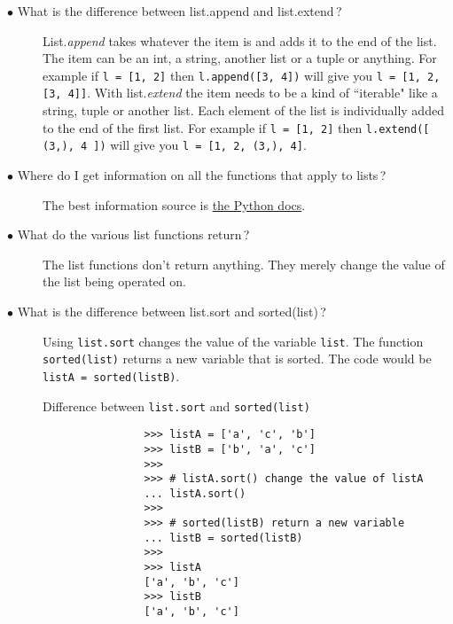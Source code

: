 \documentclass{article}
\newcommand{\inlinecode}[1]{\texttt{#1}}
\newcommand{\link}[2]{\textcolor{blue}{\href{#2}{#1}}}
\newcommand{\question}[1]{\item[$\bullet$ #1] \hfil}
\newenvironment{answer}{\newline}{}
\newenvironment{faq}{\begin{description}}{\end{description}}
\begin{document}
\begin{faq}
		\question{What is the difference between list.append and list.extend\,?}
		\begin{answer}
			List.\textit{append} takes whatever the item is and adds it to the end of the list. The item can be an int, a string, another list or a tuple or anything. For example if \inlinecode{l = [1, 2]} then \inlinecode{l.append([3, 4])} will give you \inlinecode{l = [1, 2, [3, 4]]}. With list.\textit{extend} the item needs to be a kind of ``iterable" like a string, tuple or another list. Each element of the list is individually added to the end of the first list. For example if \inlinecode{l = [1, 2]} then \inlinecode{l.extend([ (3,), 4 ])} will give you \inlinecode{l = [1, 2, (3,), 4]}.
		\end{answer}
		
		\question{Where do I get information on all the functions that apply to lists\,?}
		\begin{answer}
			The best information source is \link{the Python docs}{https://docs.python.org/3/tutorial/datastructures.html}.
		\end{answer}
		
		\question{What do the various list functions return\,?}
		\begin{answer}
			The list functions don't return anything. They merely change the value of the list being operated on.
		\end{answer}
		
		\question{What is the difference between list.sort and sorted(list)\,?}
		\begin{answer}
			Using \inlinecode{list.sort} changes the value of the variable \inlinecode{list}. The function \inlinecode{sorted(list)} returns a new variable that is sorted. The code would be \inlinecode{listA = sorted(listB)}. \newpage
			
			\begin{table}[htb]
				\caption{Difference between \texttt{list.sort} and \texttt{sorted(list)}}
				\begin{verbatim}
				>>> listA = ['a', 'c', 'b']
				>>> listB = ['b', 'a', 'c']
				>>>
				>>> # listA.sort() change the value of listA
				... listA.sort()
				>>>
				>>> # sorted(listB) return a new variable
				... listB = sorted(listB)
				>>>
				>>> listA
				['a', 'b', 'c']
				>>> listB
				['a', 'b', 'c']
				\end{verbatim}
			\end{table}
			
		\end{answer}
		

\end{faq}
\end{document}
